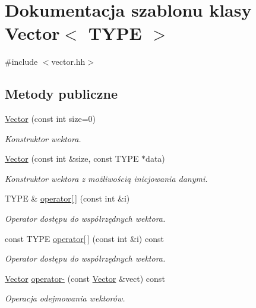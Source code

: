 \hypertarget{class_vector}{\section{Dokumentacja szablonu klasy Vector$<$ T\-Y\-P\-E $>$}
\label{class_vector}
}


{\ttfamily \#include $<$vector.\-hh$>$}

\subsection*{Metody publiczne}
\begin{DoxyCompactItemize}
\item 
\hyperlink{class_vector_a7abfa78474ee093d38ab61630fff0c69}{Vector} (const int size=0)
\begin{DoxyCompactList}\small\item\em Konstruktor wektora. \end{DoxyCompactList}\item 
\hyperlink{class_vector_ab6f9e2ab5a0ef64bde8eab33a5d0790f}{Vector} (const int \&size, const T\-Y\-P\-E $\ast$data)
\begin{DoxyCompactList}\small\item\em Konstruktor wektora z możliwością inicjowania danymi. \end{DoxyCompactList}\item 
T\-Y\-P\-E \& \hyperlink{class_vector_a6871e4b685d04c8b940b81b967d62176}{operator\mbox{[}$\,$\mbox{]}} (const int \&i)
\begin{DoxyCompactList}\small\item\em Operator dostępu do współrzędnych wektora. \end{DoxyCompactList}\item 
const T\-Y\-P\-E \hyperlink{class_vector_ab93cdf3a0431a7cd7f73ea4a43bc00f5}{operator\mbox{[}$\,$\mbox{]}} (const int \&i) const 
\begin{DoxyCompactList}\small\item\em Operator dostępu do współrzędnych wektora. \end{DoxyCompactList}\item 
\hyperlink{class_vector}{Vector} \hyperlink{class_vector_a858ee9def9d396faa190cc7cdc240a69}{operator-\/} (const \hyperlink{class_vector}{Vector} \&vect) const 
\begin{DoxyCompactList}\small\item\em Operacja odejmowania wektorów. \end{DoxyCompactList}\item 

\end{DoxyCompactItemize}
